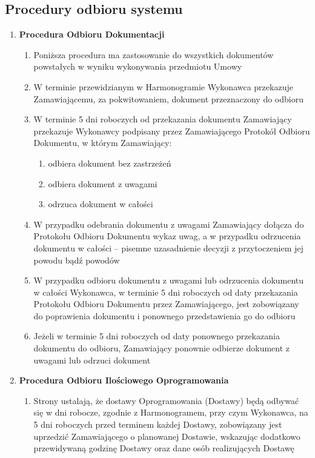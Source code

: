\documentclass{article}
\begin{document}
\subsection{Procedury odbioru systemu}
\begin{enumerate}
\item \textbf{Procedura Odbioru Dokumentacji}
\begin{enumerate}
\item Poniższa procedura ma zastosowanie do wszystkich dokumentów powstałych w wyniku wykonywania przedmiotu Umowy
\item W terminie przewidzianym w Harmonogramie Wykonawca przekazuje Zamawiającemu, za pokwitowaniem, dokument przeznaczony do odbioru
\item W terminie 5 dni roboczych od przekazania dokumentu Zamawiający przekazuje Wykonawcy podpisany przez Zamawiającego Protokół Odbioru Dokumentu, w którym Zamawiający:
\begin{enumerate}
\item odbiera dokument bez zastrzeżeń
\item odbiera dokument z uwagami
\item odrzuca dokument w całości
\end{enumerate}
\item W przypadku odebrania dokumentu z uwagami Zamawiający dołącza do Protokołu Odbioru Dokumentu wykaz uwag, a w przypadku odrzucenia dokumentu w całości – pisemne uzasadnienie decyzji z przytoczeniem jej powodu bądź powodów
\item W przypadku odbioru dokumentu z uwagami lub odrzucenia dokumentu w całości Wykonawca, w terminie 5 dni roboczych od daty przekazania Protokołu Odbioru Dokumentu przez Zamawiającego, jest zobowiązany do poprawienia dokumentu i ponownego przedstawienia go do odbioru
\item Jeżeli w terminie 5 dni roboczych od daty ponownego przekazania dokumentu do odbioru,  Zamawiający ponownie odbierze dokument z uwagami lub odrzuci dokument
\end{enumerate}
\item \textbf{Procedura Odbioru Ilościowego Oprogramowania}
\begin{enumerate}
\item Strony ustalają, że dostawy Oprogramowania (Dostawy) będą odbywać się w dni robocze, zgodnie z Harmonogramem, przy czym Wykonawca, na 5 dni roboczych przed terminem każdej Dostawy, zobowiązany jest uprzedzić Zamawiającego o planowanej Dostawie, wskazując dodatkowo przewidywaną godzinę Dostawy oraz dane osób realizujących Dostawę

\end{enumerate}
\end{enumerate}
\end{document}
